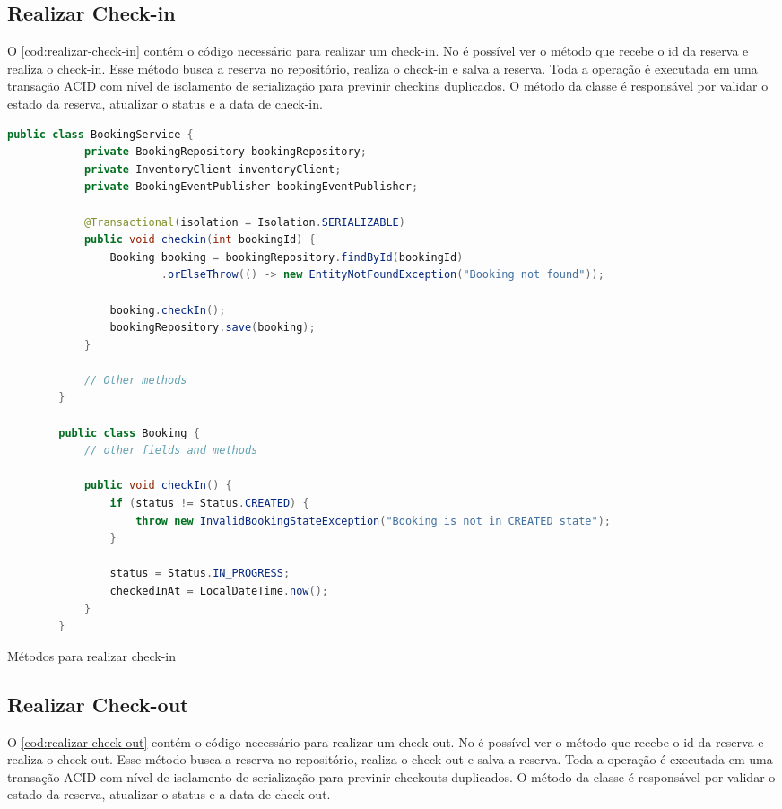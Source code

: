 \subsection{Realizar Check-in}
O \autoref{cod:realizar-check-in} contém o código necessário para realizar um check-in. No  é possível ver o método  que recebe o id da reserva e realiza o check-in. Esse método busca a reserva no repositório, realiza o check-in e salva a reserva. Toda a operação é executada em uma transação ACID com nível de isolamento de serialização para previnir checkins duplicados. O método  da classe  é responsável por validar o estado da reserva, atualizar o status e a data de check-in.

\begin{codigo}[H]
    \begin{lstlisting}[language=Java]
        public class BookingService {
            private BookingRepository bookingRepository;
            private InventoryClient inventoryClient;
            private BookingEventPublisher bookingEventPublisher;

            @Transactional(isolation = Isolation.SERIALIZABLE)
            public void checkin(int bookingId) {
                Booking booking = bookingRepository.findById(bookingId)
                        .orElseThrow(() -> new EntityNotFoundException("Booking not found"));
        
                booking.checkIn();
                bookingRepository.save(booking);
            }

            // Other methods
        }

        public class Booking {
            // other fields and methods

            public void checkIn() {
                if (status != Status.CREATED) {
                    throw new InvalidBookingStateException("Booking is not in CREATED state");
                }
        
                status = Status.IN_PROGRESS;
                checkedInAt = LocalDateTime.now();
            }
        }
    \end{lstlisting}
    \caption{Métodos para realizar check-in}
    \label{cod:realizar-check-in}
\end{codigo}

\subsection{Realizar Check-out}
O \autoref{cod:realizar-check-out} contém o código necessário para realizar um check-out. No  é possível ver o método  que recebe o id da reserva e realiza o check-out. Esse método busca a reserva no repositório, realiza o check-out e salva a reserva. Toda a operação é executada em uma transação ACID com nível de isolamento de serialização para previnir checkouts duplicados. O método  da classe  é responsável por validar o estado da reserva, atualizar o status e a data de check-out.

